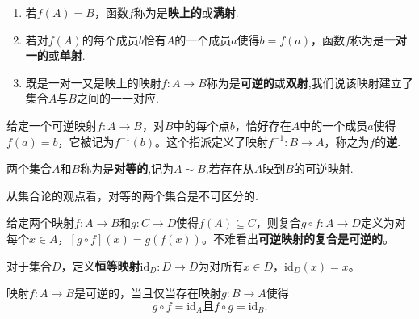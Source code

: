 \documentclass[lang=cn,newtx,10pt,scheme=chinese]{../Template/elegantbook}
\begin{document}
\begin{definition}[满射、单射和双射]\label{definition:满射、单射和双射}
\begin{enumerate}
  \item 若\(f(A)=B\)，函数\(f\)称为是\textbf{映上的}或\textbf{满射}.

  \item 若对\(f(A)\)的每个成员\(b\)恰有\(A\)的一个成员\(a\)使得\(b = f(a)\)，函数\(f\)称为是\textbf{一对一的}或\textbf{单射}.

  \item 既是一对一又是映上的映射\(f:A\to B\)称为是\textbf{可逆的}或\textbf{双射},我们说该映射建立了集合\(A\)与\(B\)之间的一一对应.
\end{enumerate}
\end{definition}  

\begin{definition}[可逆映射的逆]\label{definition:可逆映射的逆}
  给定一个可逆映射\(f:A\to B\)，对\(B\)中的每个点\(b\)，恰好存在\(A\)中的一个成员\(a\)使得\(f(a)=b\)，它被记为\(f^{-1}(b)\)。这个指派定义了映射\(f^{-1}:B\to A\)，称之为\(f\)的\textbf{逆}.
\end{definition}

\begin{definition}[对等的集合]\label{definition:对等的集合}
  两个集合\(A\)和\(B\)称为是\textbf{对等的},记为$A\sim B$,若存在从\(A\)映到\(B\)的可逆映射.
\end{definition}
\begin{remark}
  从集合论的观点看，对等的两个集合是不可区分的.
\end{remark}

\begin{proposition}[可逆映射的复合是可逆的]\label{proposition:可逆映射的复合是可逆的}
  给定两个映射\(f:A\to B\)和\(g:C\to D\)使得\(f(A)\subseteq C\)，则复合\(g\circ f:A\to D\)定义为对每个\(x\in A\)，\([g\circ f](x)=g(f(x))\)。不难看出\textbf{可逆映射的复合是可逆的}。
\end{proposition}

\begin{definition}[恒等映射]\label{definition:恒等映射}
  对于集合\(D\)，定义\textbf{恒等映射}\(\text{id}_D:D\to D\)为对所有\(x\in D\)，\(\text{id}_D(x)=x\)。
\end{definition}

\begin{proposition}[可逆映射的充要条件]\label{proposition:可逆映射的充要条件1}
映射\(f:A\to B\)是可逆的，当且仅当存在映射\(g:B\to A\)使得
\[
g\circ f = \text{id}_A且f\circ g = \text{id}_B.
\]
\end{proposition}
\end{document}
